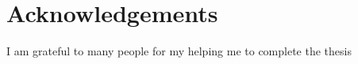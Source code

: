 \chapter*{Acknowledgements}
\renewcommand{\baselinestretch}{1.5}
I am grateful to many people for my helping me to complete the thesis



